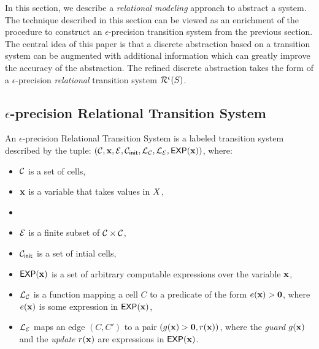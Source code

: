 In this section, we describe a {\em relational modeling} approach to
abstract a system. The technique described in this section can be
viewed as an enrichment of the procedure to construct an
$\epsilon$-precision transition system from the previous section.  The
central idea of this paper is that a discrete abstraction based on a
transition system can be augmented with additional information which
can greatly improve the accuracy of the abstraction. The refined
discrete abstraction takes the form of a $\epsilon$-precision {\em
relational} transition system $\mathcal{R}^{\epsilon}(S)$.

\subsection{$\epsilon$-precision Relational Transition System}

An $\epsilon$-precision Relational Transition System is a labeled
transition system described by the tuple:
$(\mathcal{C},\mathbf{x},\mathcal{E},\mathcal{C}_{\mathsf{init}},\mathcal{L}_\mathcal{C},
\mathcal{L}_\mathcal{E},\mathsf{EXP}(\mathbf{x}))$, where:

\begin{itemize}
\item
$\mathcal{C}$ is a set of cells,
\item
$\mathbf{x}$ is a variable that takes values in $X$,
\item
\item
$\mathcal{E}$ is a finite subset of $\mathcal{C} \times \mathcal{C}$,
\item
$\mathcal{C}_{\mathsf{init}}$ is a set of intial cells,
\item
$\mathsf{EXP}(\mathbf{x})$ is a set of arbitrary computable expressions over the
variable $\mathbf{x}$,
\item
$\mathcal{L}_\mathcal{C}$ is a function mapping a cell $C$ to a
predicate of the form $e(\mathbf{x}) > \mathbf{0}$, where $e(\mathbf{x})$ is some
expression in $\mathsf{EXP}(\mathbf{x})$,
\item
$\mathcal{L}_\mathcal{E}$ maps an edge $(C,C')$ to a pair
$(g(\mathbf{x})>\mathbf{0}, r(\mathbf{x}))$, where the {\em guard} $g(\mathbf{x})$ and the
{\em update} $r(\mathbf{x})$ are expressions in $\mathsf{EXP}(\mathbf{x})$.
\end{itemize}






